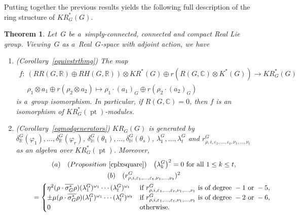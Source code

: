 \documentclass[11pt]{article}
\numberwithin{equation}{section}
\newtheorem{Theorem}{Theorem}[section]
\DeclareMathOperator{\pt}{pt}
\begin{document}
Putting together the previous results yields the following full description of the ring structure of $KR_G^*(G)$.
\begin{Theorem}
\label{mainthm2}
Let~$G$ be a~simply-connected, connected and compact Real Lie group.
Viewing~$G$ as a~Real~$G$-space with adjoint action, we have
\begin{enumerate}\itemsep=0pt
\item[$1.$] {\rm (}Corollary~{\rm \ref{equivstrthmg})} The map
\begin{gather*}
f: \ (RR(G, \mathbb{R})\oplus RH(G, \mathbb{R}))\otimes KR^*(G)\oplus r(R(G, \mathbb{C})\otimes K^*(G))\to KR_G^*(G)
\\
\phantom{f: {}} \
\rho_1\otimes a_1\oplus r(\rho_2\otimes a_2)\mapsto \rho_1\cdot (a_1)_{G}\oplus r(\rho_2\cdot (a_2)_G)
\end{gather*}
is a~group isomorphism.
In particular, if $R(G, \mathbb{C})=0$, then $f$ is an isomorphism of $KR^*_{G}(\pt)$-modules.
\item[$2.$] {\rm (}Corollary~{\rm \ref{eqmodgenerators})}
$KR_{G}(G)$ is generated by $\delta_\mathbb{R}^G(\varphi_1), {\dots}, \delta_\mathbb{R}^G(\varphi_r)$,
$\delta_\mathbb{H}^G(\theta_1), {\dots}, \delta_\mathbb{H}^G(\theta_s)$, $\lambda_1^G, {\dots}, \lambda_t^G\!$ and
$r^G_{\rho, i, \varepsilon_1, \dots, \varepsilon_t, \nu_1, \dots, \nu_t}$ as an algebra over $KR_{G}^*(\pt)$.
Moreover,
\begin{gather}
(a)\quad{\rm (}Proposition~{\rm \ref{cplxsquare})} \quad \big(\lambda_k^G\big)^2=0\text{ for all }1\leq k\leq t,\nonumber
\\ \label{cplxrel1}
(b)\quad
(r^G_{\rho, i, \varepsilon_1, \dots, \varepsilon_t, \nu_1, \dots, \nu_t})^2
\\
\phantom{(b)\quad}
=
\begin{cases}
\eta^2(\rho\cdot\overline{\sigma_G^*}
\rho)(\lambda^G_1)^{\omega_1}\cdots(\lambda_t^G)^{\omega_t}
&
\text{if }r^G_{\rho, i, \varepsilon_1, \dots, \varepsilon_t, \nu_1, \dots, \nu_t}
\text{ is of degree} \ -1\text{ or }-5,
\\
\pm\mu(\rho\cdot\overline{\sigma_G^*}
\rho)(\lambda^G_1)^{\omega_1}\cdots(\lambda_t^G)^{\omega_t}
&
\text{if }r^G_{\rho, i, \varepsilon_1, \dots, \varepsilon_t, \nu_1, \dots, \nu_t}
\text{ is of degree} \ -2\text{ or }-6,
\\
0
&\text{otherwise}.
\end{cases}
\nonumber
\end{gather}

\end{enumerate}
\end{Theorem}
\end{document}
